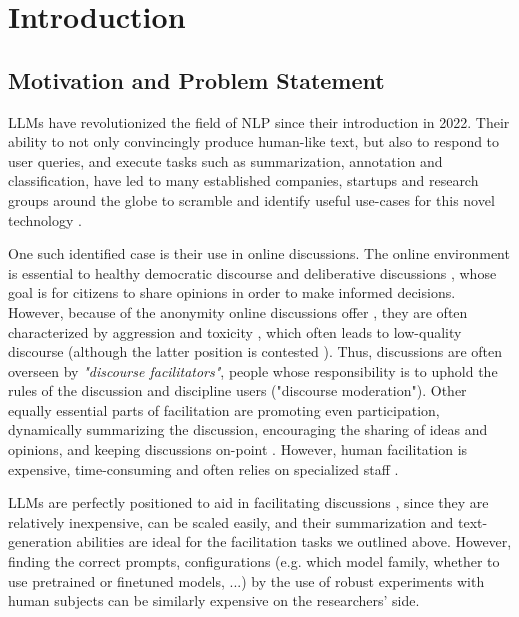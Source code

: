 %
\chapter{Introduction}
\label{sec:intro}

\section{Motivation and Problem Statement}
\label{sec:intro:motivation}

\acp{LLM} have revolutionized the field of \ac{NLP} since their introduction in 2022. Their ability to not only convincingly produce human-like text, but also to respond to user queries, and execute tasks such as summarization, annotation and classification, have led to many established companies, startups and research groups around the globe to scramble and identify useful use-cases for this novel technology \cite{HadiASO, Zhou2024LargeLM, Hutchinson2024LLMAssistedVA}.

One such identified case is their use in online discussions. The online environment is essential to  healthy democratic discourse \cite{WrightDemocracy, Janssen2005, Papacharissi2004DemocracyOC} and deliberative discussions \cite{small2021polis}, whose goal is for citizens to share opinions in order to make informed decisions. However, because of the anonymity online discussions offer \cite{Avalle2024PersistentIP}, they are often characterized by aggression and toxicity \cite{XiaToxicity}, which often leads to low-quality discourse \cite{WrightDemocracy} (although the latter position is contested \cite{Papacharissi2004DemocracyOC}). Thus, discussions are often overseen by \textit{"discourse facilitators"}, people whose responsibility is to uphold the rules of the discussion and discipline users ("discourse moderation"). Other equally essential parts of facilitation are promoting even participation, dynamically summarizing the discussion, encouraging the sharing of ideas and opinions, and keeping discussions on-point \cite{Harvard2024, Wang2008StudentfacilitatorsRI}. However, human facilitation is expensive, time-consuming and often relies on specialized staff \cite{small-polis-llm}.

LLMs are perfectly positioned to aid in facilitating discussions \cite{small-polis-llm}, since they are relatively inexpensive, can be scaled easily, and their summarization and text-generation abilities are ideal for the facilitation tasks we outlined above. However, finding the correct prompts, configurations (e.g. which model family, whether to use pretrained or finetuned models, ...) by the use of robust experiments with human subjects can be similarly expensive on the researchers' side.

